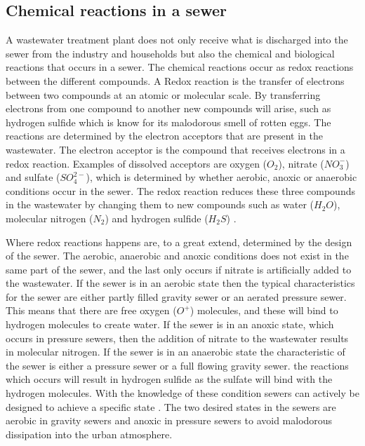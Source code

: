 \subsection{Chemical reactions in a sewer}\label{subse:chemical_reactions_in_a_sewer}
A wastewater treatment plant does not only receive what is discharged into the sewer from the industry and households but also the chemical and biological reactions that occurs in a sewer. The chemical reactions occur as redox reactions between the different compounds. A Redox reaction is the transfer of electrons between two compounds at an atomic or molecular scale. By transferring electrons from one compound to another new compounds will arise, such as hydrogen sulfide which is know for its malodorous smell of rotten eggs. The reactions are determined by the electron acceptors that are present in the wastewater. The electron acceptor is the compound that receives electrons in a redox reaction. Examples of dissolved acceptors are oxygen ($O_2$), nitrate ($NO^-_3$) and sulfate ($SO^{2-}_4$), which is determined by whether aerobic, anoxic or anaerobic conditions occur in the sewer. The redox reaction reduces these three compounds in the wastewater by changing them to new compounds such as water ($H_2O$), molecular nitrogen ($N_2$) and hydrogen sulfide ($H_2S$) \cite{Sewer_processes}. 

Where redox reactions happens are, to a great extend, determined by the design of the sewer. The aerobic, anaerobic and anoxic conditions does not exist in the same part of the sewer, and the last only occurs if nitrate is artificially added to the wastewater. If the sewer is in an aerobic state then the typical characteristics for the sewer are either partly filled gravity sewer or an aerated pressure sewer. This means that there are free oxygen ($O^+$) molecules, and these will bind to hydrogen molecules to create water. If the sewer is in an anoxic state, which occurs in pressure sewers, then the addition of nitrate to the wastewater results in molecular nitrogen. If the sewer is in an anaerobic state the characteristic of the sewer is either a pressure sewer or a full flowing gravity sewer. the reactions which occurs will result in hydrogen sulfide as the sulfate will bind with the hydrogen molecules. With the knowledge of these condition sewers can actively be designed to achieve a specific state \cite{Sewer_processes}. The two desired states in the sewers are aerobic in gravity sewers and anoxic in pressure sewers to avoid malodorous dissipation into the urban atmosphere.


